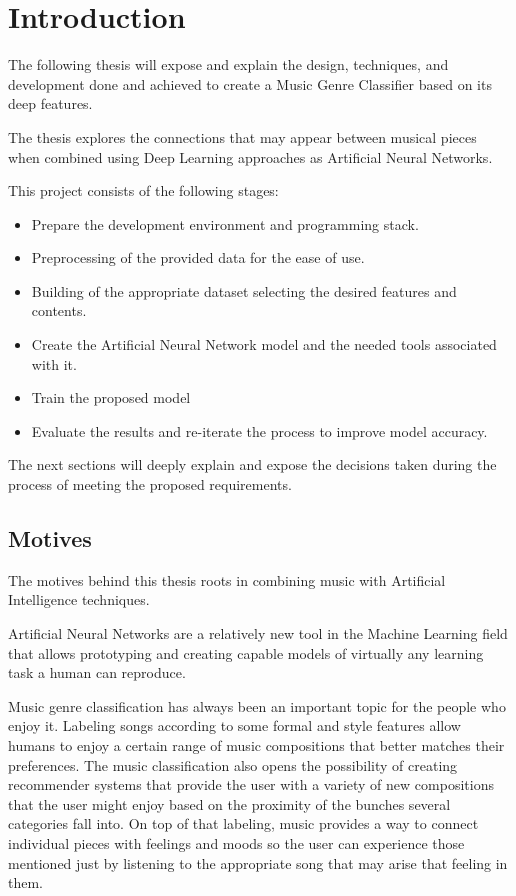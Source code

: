 
\chapter{Introduction}

\label{introduction}
The following thesis will expose and explain the design, techniques, and development done and achieved to create a Music Genre Classifier based on its deep features.

The thesis explores the connections that may appear between musical pieces when combined using Deep Learning approaches as Artificial Neural Networks.

This project consists of the following stages:

\begin{itemize}
    \item Prepare the development environment and programming stack.
    \item Preprocessing of the provided data for the ease of use.
    \item Building of the appropriate dataset selecting the desired features and contents.
    \item Create the Artificial Neural Network model and the needed tools associated with it.
    \item Train the proposed model
    \item Evaluate the results and re-iterate the process to improve model accuracy.
\end{itemize}
  
The next sections will deeply explain and expose the decisions taken during the process of meeting the proposed requirements.
\newpage

\section{Motives}
The motives behind this thesis roots in combining music with Artificial Intelligence techniques.

Artificial Neural Networks are a relatively new tool in the Machine Learning field that allows prototyping and creating capable models of virtually any learning task a human can reproduce.

Music genre classification has always been an important topic for the people who enjoy it. Labeling songs according to some formal and style features allow humans to enjoy a certain range of music compositions that better matches their preferences. The music classification also opens the possibility of creating recommender systems that provide the user with a variety of new compositions that the user might enjoy based on the proximity of the bunches several categories fall into. On top of that labeling, music provides a way to connect individual pieces with feelings and moods so the user can experience those mentioned just by listening to the appropriate song that may arise that feeling in them.


